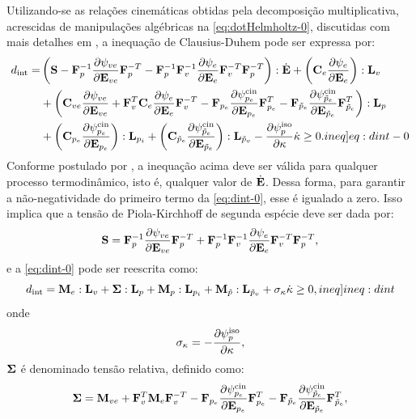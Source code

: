 \documentclass[Tese.tex]{subfiles}
\begin{document}
Utilizando-se as relações cinemáticas obtidas pela decomposição multiplicativa, acrescidas de manipulações algébricas na \cref{eq:dotHelmholtz-0}, discutidas com mais detalhes em , a inequação de Clausius-Duhem pode ser expressa por:
\begin{equation}
\begin{aligned}
\dissipation = & \left(\S-\Fp^{-1}\dfrac{\partial \helmholtzve}{\partial \Eve}\Fp^{-T}-\Fp^{-1}\Fv^{-1}\dfrac{\partial \helmholtze}{\partial \Ee}\Fv^{-T}\Fp^{-T}\right):\dotE + \left(\Ce\dfrac{\partial \helmholtze}{\partial \Ee} \right):\Lv \\&+ \left(\Cve\dfrac{\partial \helmholtzve}{\partial \Eve} + \Fv^T\Ce\dfrac{\partial \helmholtze}{\partial \Ee}\Fv^{-T} - \Fpe\dfrac{\partial \helmholtzkin}{\partial \Epe}\Fpe^{T} - \Fpve\dfrac{\partial \helmholtzkinv}{\partial \Epve}\Fpve^{T}\right):\Lp  \\&+ \left( \Cpe\dfrac{\partial \helmholtzkin}{\partial \Epe} \right):\Lpi  + \left(\Cpve\dfrac{\partial \helmholtzkinv}{\partial \Epve}\right):\Lpvi - \dfrac{\partial \helmholtzisop}{\partial \encruamento}\dotencruamento \geq 0. \label[ineq]{eq:dint-0}
\end{aligned}
\end{equation}
Conforme postulado por , a inequação acima deve ser válida para qualquer processo termodinâmico, isto é, qualquer valor de $\dot{\mathbf{E}}$. Dessa forma, para garantir a não-negatividade do primeiro termo da \cref{eq:dint-0}, esse é igualado a zero. Isso implica que a tensão de Piola-Kirchhoff de segunda espécie deve ser dada por:
\begin{equation}
\mathbf{S} = \mathbf{F}_p^{-1}\dfrac{\partial \psi_{ve}}{\partial \mathbf{E}_{ve}}\mathbf{F}_p^{-T} + \mathbf{F}_p^{-1}\mathbf{F}_v^{-1}\dfrac{\partial \psi_e}{\partial \mathbf{E}_e}\mathbf{F}_v^{-T}\mathbf{F}_p^{-T}, \label{eq:S-vep}
\end{equation}
e a \cref{eq:dint-0} pode ser reescrita como:
\begin{equation}
\dissipation = \mandele:\Lv + \relativeStress:\Lp + \mandelpe:\Lpi + \mandelpve:\Lpvi + \yieldStress\dotencruamento \geq 0, \label[ineq]{ineq:dint}
\end{equation}
onde 
\begin{equation}
\sigma_{\kappa} = -\dfrac{\partial\psi_p^\text{iso}}{\partial\kappa},
\end{equation}
$\boldsymbol{\Sigma}$ é denominado tensão relativa, definido como:
\begin{equation}
\boldsymbol{\Sigma} = \mathbf{M}_{ve} + \mathbf{F}_v^T\mathbf{M}_e\mathbf{F}_v^{-T} - \mathbf{F}_{p_e}\dfrac{\partial \psi_{p_e}^\text{cin}}{\partial \mathbf{E}_{p_e}}\mathbf{F}_{p_e}^{T} - \mathbf{F}_{\tilde{p}_e}\dfrac{\partial \psi_{\tilde{p}_e}^\text{cin}}{\partial \mathbf{E}_{\tilde{p}_e}}\mathbf{F}_{\tilde{p}_e}^{T}, \label{eq:relativeStress}
\end{equation}
\end{document}
